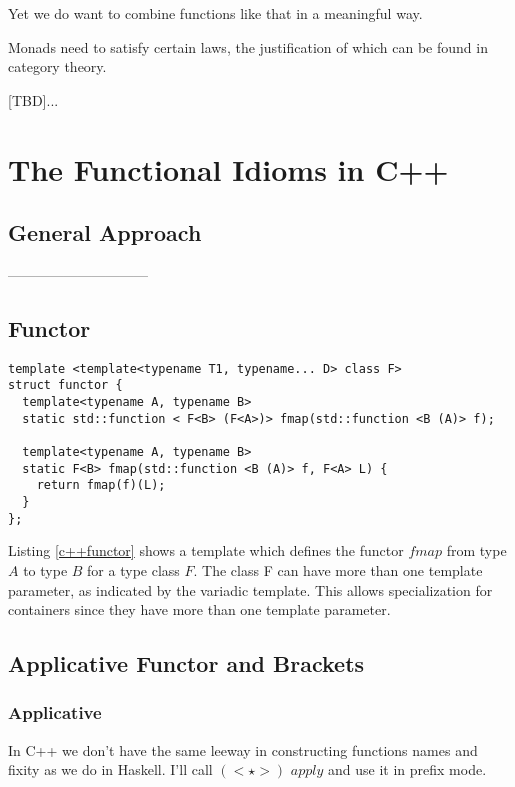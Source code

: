 \documentclass[12pt,fleqn]{article}
\begin{document}
Yet we do want  to combine functions like that in a meaningful way. 

Monads need to satisfy certain laws, the justification of which can be found in category theory.

[TBD]...


%
%
\section{The Functional Idioms in C++}
%
%
%

\subsection{General Approach}
------------------------------

\subsection{Functor}
%
\begin{lstlisting}[caption=functor in C++, label=c++functor]
template <template<typename T1, typename... D> class F>
struct functor {
  template<typename A, typename B>
  static std::function < F<B> (F<A>)> fmap(std::function <B (A)> f);

  template<typename A, typename B>
  static F<B> fmap(std::function <B (A)> f, F<A> L) {
    return fmap(f)(L);
  }
};
\end{lstlisting}
Listing \ref{c++functor} shows a template which defines the functor $fmap$ from type $A$ to type $B$ for a type class $F$. 
The class F can have more than one template parameter, as indicated by the variadic template.
This allows specialization for containers since they have more than one template parameter.


%
%
\subsection{Applicative Functor and Brackets}
%
%
%
\subsubsection{Applicative}
%
%
In C++ we don't have the same leeway in  constructing functions names and fixity as we do in Haskell.
I'll call $(<\star>)$ $apply$ and use it in prefix mode.
\end{document}

